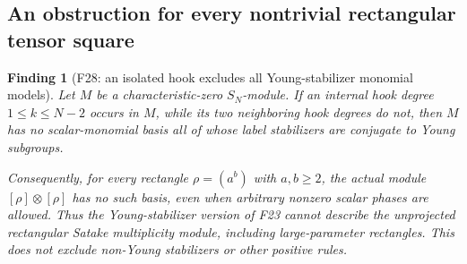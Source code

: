 \documentclass[11pt,a4paper]{article}
\newcommand{\fid}[1]{\textsf{#1}}\newcommand{\gate}[1]{\textsf{#1}}
\theoremstyle{named}\newtheorem{finding}{Finding}[section]
\theoremstyle{definition}\newtheorem{definition}[finding]{Definition}
\theoremstyle{remark}\newtheorem{remark}[finding]{Remark}
\begin{document}
\subsection{An obstruction for every nontrivial rectangular tensor square}
\begin{finding}[\fid{F28}: an isolated hook excludes all Young-stabilizer monomial models]\label{f:recthooks}
Let $M$ be a characteristic-zero $S_N$-module. If an internal hook
degree $1\le k\le N-2$ occurs in $M$, while its two neighboring
hook degrees do not, then $M$ has no scalar-monomial basis all of
whose label stabilizers are conjugate to Young subgroups.

Consequently, for \emph{every} rectangle $\rho=(a^b)$ with $a,b\ge2$,
the actual module $[\rho]\otimes[\rho]$ has no such basis, even when
arbitrary nonzero scalar phases are allowed. Thus the Young-stabilizer
version of \fid{F23} cannot describe the unprojected rectangular
Satake multiplicity module, including large-parameter rectangles.
This does not exclude non-Young stabilizers or other positive rules.
\end{finding}
\end{document}
